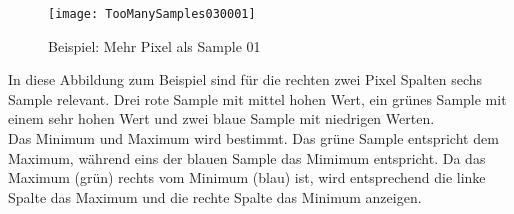 \begin{figure}[ht]
	\centering
	\texttt{[image: TooManySamples030001]}
	\caption{Beispiel: Mehr Pixel als Sample 01}
	\label{fig:gauge}
\end{figure}
In diese Abbildung zum Beispiel sind für die rechten zwei Pixel Spalten sechs Sample relevant. Drei rote Sample mit mittel hohen Wert, ein grünes Sample mit einem sehr hohen Wert und zwei blaue Sample mit niedrigen Werten.\\
Das Minimum und Maximum wird bestimmt. Das grüne Sample entspricht dem Maximum, während eins der blauen Sample das Mimimum entspricht. Da das Maximum (grün) rechts vom Minimum (blau) ist, wird entsprechend die linke Spalte das Maximum und die rechte Spalte das Minimum anzeigen.\\